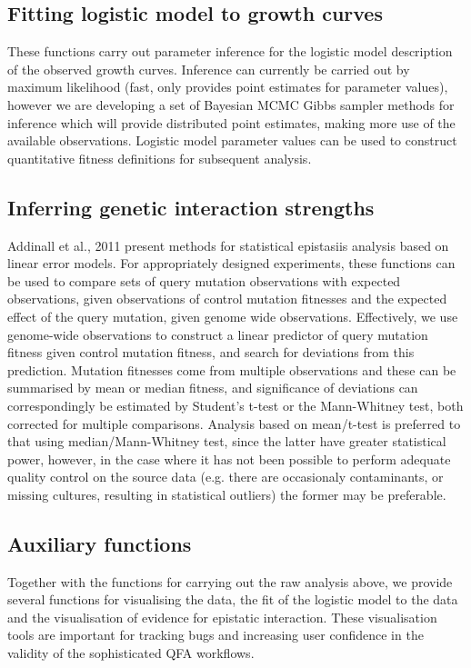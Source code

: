\documentclass [a4paper]{article}
\begin{document}
\subsection{Fitting logistic model to growth curves}
These functions carry out parameter inference for the logistic model description of the observed growth curves. Inference can currently be carried out by maximum likelihood (fast, only provides point estimates for parameter values), however we are developing a set of Bayesian MCMC Gibbs sampler methods for inference which will provide distributed point estimates, making more use of the available observations. Logistic model parameter values can be used to construct quantitative fitness definitions for subsequent analysis.

\subsection{Inferring genetic interaction strengths}
Addinall et al., 2011 present methods for statistical epistasiis analysis based on linear error models. For appropriately designed experiments, these functions can be used to compare sets of query mutation observations with expected observations, given observations of control mutation fitnesses and the expected effect of the query mutation, given genome wide observations. Effectively, we use genome-wide observations to construct a linear predictor of query mutation fitness given control mutation fitness, and search for deviations from this prediction. Mutation fitnesses come from multiple observations and these can be summarised by mean or median fitness, and significance of deviations can correspondingly be estimated by Student's t-test or the Mann-Whitney test, both corrected for multiple comparisons. Analysis based on mean/t-test is preferred to that using median/Mann-Whitney test, since the latter have greater statistical power, however, in the case where it has not been possible to perform adequate quality control on the source data (e.g. there are occasionaly contaminants, or missing cultures, resulting in statistical outliers) the former may be preferable.

\subsection{Auxiliary functions}
Together with the functions for carrying out the raw analysis above, we provide several functions for visualising the data, the fit of the logistic model to the data and the visualisation of evidence for epistatic interaction. These visualisation tools are important for tracking bugs and increasing user confidence in the validity of the sophisticated QFA workflows.
\end{document}
